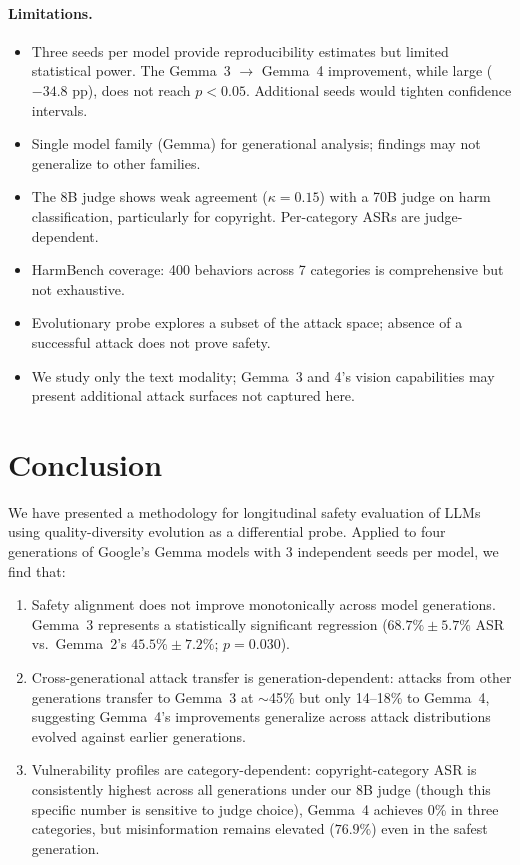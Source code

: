 \documentclass{article}
\begin{document}
\paragraph{Limitations.}
\begin{itemize}
    \item Three seeds per model provide reproducibility estimates but
          limited statistical power. The Gemma~3 $\to$ Gemma~4
          improvement, while large ($-34.8$ pp), does not reach
          $p < 0.05$. Additional seeds would tighten confidence
          intervals.
    \item Single model family (Gemma) for generational analysis;
          findings may not generalize to other families.
    \item The 8B judge shows weak agreement ($\kappa = 0.15$) with a
          70B judge on harm classification, particularly for
          copyright. Per-category ASRs are judge-dependent.
    \item HarmBench coverage: 400 behaviors across 7 categories is
          comprehensive but not exhaustive.
    \item Evolutionary probe explores a subset of the attack space;
          absence of a successful attack does not prove safety.
    \item We study only the text modality; Gemma~3 and 4's vision
          capabilities may present additional attack surfaces not
          captured here.
\end{itemize}

\section{Conclusion}
\label{sec:conclusion}

We have presented a methodology for longitudinal safety evaluation of LLMs
using quality-diversity evolution as a differential probe. Applied to four
generations of Google's Gemma models with 3 independent seeds per model,
we find that:

\begin{enumerate}
    \item Safety alignment does not improve monotonically across model
          generations. Gemma~3 represents a statistically significant
          regression ($68.7\% \pm 5.7\%$ ASR vs.\ Gemma~2's
          $45.5\% \pm 7.2\%$; $p = 0.030$).
    \item Cross-generational attack transfer is generation-dependent:
          attacks from other generations transfer to Gemma~3 at
          $\sim$45\% but only 14--18\% to Gemma~4, suggesting
          Gemma~4's improvements generalize across attack
          distributions evolved against earlier generations.
    \item Vulnerability profiles are category-dependent:
          copyright-category ASR is consistently highest across all
          generations under our 8B judge (though this specific number
          is sensitive to judge choice), Gemma~4 achieves 0\% in
          three categories, but misinformation remains elevated
          ($76.9\%$) even in the safest generation.
\end{enumerate}
\end{document}
